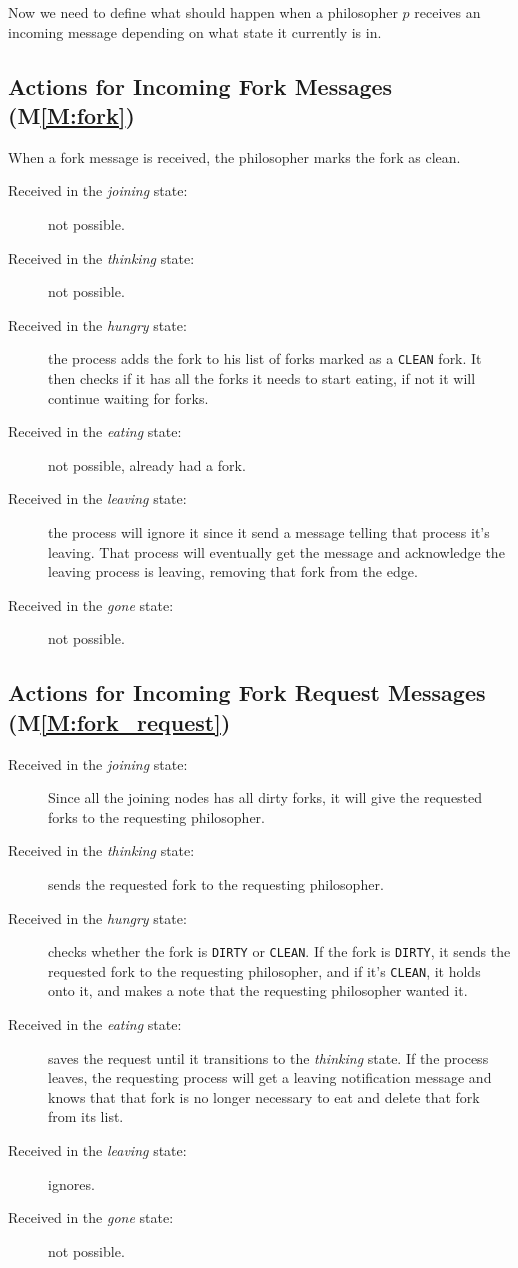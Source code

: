 \documentclass[11pt]{article}
\begin{document}
Now we need to define what should happen when a philosopher $p$ receives an incoming message depending on what state it currently is in.
\subsection{Actions for Incoming Fork Messages (M\ref{M:fork})}
When a fork message is received, the philosopher marks the fork as clean.
\begin{description}
\item[Received in the \textit{joining} state:] not possible.
\item[Received in the \textit{thinking} state:] not possible.
\item[Received in the \textit{hungry} state:] the process adds the fork to his list of forks marked as a \texttt{CLEAN} fork. It then checks if it has all the forks it needs to start eating, if not it will continue waiting for forks.
\item[Received in the \textit{eating} state:] not possible, already had a fork.
\item[Received in the \textit{leaving} state:] the process will ignore it since it send a message telling that process it's leaving. That process will eventually get the message and acknowledge the leaving process is leaving, removing that fork from the edge.
\item[Received in the \textit{gone} state:] not possible.
\end{description}
\subsection{Actions for Incoming Fork Request Messages (M\ref{M:fork_request})}

\begin{description}
\item[Received in the \textit{joining} state:] Since all the joining nodes has all dirty forks, it will give the requested forks to the requesting philosopher.
\item[Received in the \textit{thinking} state:] sends the requested fork to the requesting philosopher.
\item[Received in the \textit{hungry} state:] checks whether the fork is \texttt{DIRTY} or \texttt{CLEAN}. If the fork is \texttt{DIRTY}, it sends the requested fork to the requesting philosopher, and if it's \texttt{CLEAN}, it holds onto it, and makes a note that the requesting philosopher wanted it.
\item[Received in the \textit{eating} state:] saves the request until it transitions to the \emph{thinking} state. If the process leaves, the requesting process will get a leaving notification message and knows that that fork is no longer necessary to eat and delete that fork from its list.
\item[Received in the \textit{leaving} state:] ignores.
\item[Received in the \textit{gone} state:] not possible.
\end{description}
\end{document}
